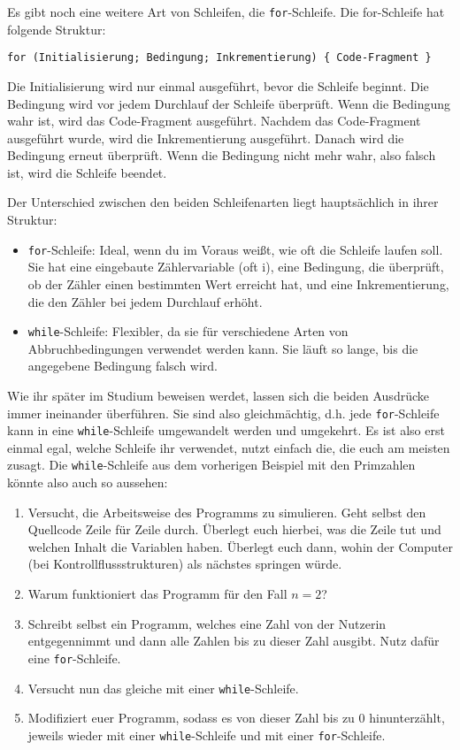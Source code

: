 Es gibt noch eine weitere Art von Schleifen, die \texttt{for}-Schleife.  Die for-Schleife hat folgende Struktur:
\begin{center}
	\texttt{for (Initialisierung; Bedingung; Inkrementierung) \{ Code-Fragment \}}
\end{center}
Die Initialisierung wird nur einmal ausgeführt, bevor die Schleife beginnt. Die Bedingung wird vor jedem Durchlauf der Schleife überprüft. Wenn die Bedingung wahr ist, wird das Code-Fragment ausgeführt. Nachdem das Code-Fragment ausgeführt wurde, wird die Inkrementierung ausgeführt. Danach wird die Bedingung erneut überprüft. Wenn die Bedingung nicht mehr wahr, also falsch ist, wird die Schleife beendet.

Der Unterschied zwischen den beiden Schleifenarten liegt hauptsächlich in ihrer Struktur:
\begin{itemize}
	\item \texttt{for}-Schleife: Ideal, wenn du im Voraus weißt, wie oft die Schleife laufen soll. Sie hat eine eingebaute Zählervariable (oft i), eine Bedingung, die überprüft, ob der Zähler einen bestimmten Wert erreicht hat, und eine Inkrementierung, die den Zähler bei jedem Durchlauf erhöht.
	\item \texttt{while}-Schleife: Flexibler, da sie für verschiedene Arten von Abbruchbedingungen verwendet werden kann. Sie läuft so lange, bis die angegebene Bedingung falsch wird.
\end{itemize}

Wie ihr später im Studium beweisen werdet, lassen sich die beiden Ausdrücke immer ineinander überführen. Sie sind also gleichmächtig, d.h. jede \texttt{for}-Schleife kann in eine \texttt{while}-Schleife umgewandelt werden und umgekehrt. Es ist also erst einmal egal, welche Schleife ihr verwendet, nutzt einfach die, die euch am meisten zusagt.\newline
Die \texttt{while}-Schleife aus dem vorherigen Beispiel mit den Primzahlen könnte also auch so aussehen:

\begin{praxis}
	\begin{enumerate}
		\item Versucht, die Arbeitsweise des Programms zu simulieren. Geht selbst
		      den Quellcode Zeile für Zeile durch. Überlegt euch hierbei, was die Zeile tut
		      und welchen Inhalt die Variablen haben. Überlegt euch dann, wohin der
		      Computer (bei Kontrollflussstrukturen) als nächstes springen würde.
		\item Warum funktioniert das Programm für den Fall $n = 2$?
		\item Schreibt selbst ein Programm, welches eine Zahl von der Nutzerin
		      entgegennimmt und dann alle Zahlen bis zu dieser Zahl ausgibt. Nutz dafür eine \texttt{for}-Schleife.
		\item Versucht nun das gleiche mit einer \texttt{while}-Schleife.
		\item Modifiziert euer Programm, sodass es von dieser Zahl bis zu 0
		      hinunterzählt, jeweils wieder mit einer \texttt{while}-Schleife und mit einer \texttt{for}-Schleife.
	\end{enumerate}
\end{praxis}

